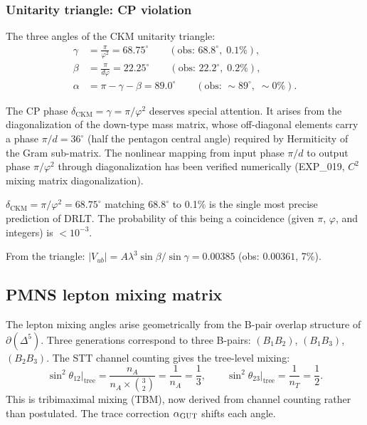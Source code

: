 \subsubsection{Unitarity triangle: CP violation}

The three angles of the CKM unitarity triangle:
\begin{align}
\gamma &= \frac{\pi}{\varphi^2} = 68.75^\circ \qquad (\text{obs: } 68.8^\circ,\; 0.1\%), \label{eq:gamma} \\
\beta &= \frac{\pi}{d\varphi} = 22.25^\circ \qquad (\text{obs: } 22.2^\circ,\; 0.2\%), \\
\alpha &= \pi - \gamma - \beta = 89.0^\circ \qquad (\text{obs: } \sim 89^\circ,\; \sim 0\%).
\end{align}

The CP phase $\delta_\text{CKM} = \gamma = \pi/\varphi^2$ deserves special attention. It arises from the diagonalization of the down-type mass matrix, whose off-diagonal elements carry a phase $\pi/d = 36^\circ$ (half the pentagon central angle) required by Hermiticity of the Gram sub-matrix. The nonlinear mapping from input phase $\pi/d$ to output phase $\pi/\varphi^2$ through diagonalization has been verified numerically (EXP\_019, $C^2$ mixing matrix diagonalization).

\begin{remark}
$\delta_\text{CKM} = \pi/\varphi^2 = 68.75^\circ$ matching $68.8^\circ$ to 0.1\% is the single most precise prediction of DRLT. The probability of this being a coincidence (given $\pi$, $\varphi$, and integers) is $< 10^{-3}$.
\end{remark}

From the triangle: $|V_{ub}| = A\lambda^3\sin\beta/\sin\gamma = 0.00385$ (obs: $0.00361$, 7\%).

\subsection{PMNS lepton mixing matrix}

The lepton mixing angles arise geometrically from the B-pair overlap structure of $\partial(\Delta^5)$.  Three generations correspond to three B-pairs: $(B_1 B_2)$, $(B_1 B_3)$, $(B_2 B_3)$.  The STT channel counting gives the tree-level mixing:
\begin{equation}
\sin^2\theta_{12}\big|_\text{tree} = \frac{n_A}{n_A \times \binom{3}{2}} = \frac{1}{n_A} = \frac{1}{3}, \qquad
\sin^2\theta_{23}\big|_\text{tree} = \frac{1}{n_T} = \frac{1}{2}.
\end{equation}
This is tribimaximal mixing (TBM), now derived from channel counting rather than postulated.  The trace correction $\alpha_{\mathrm{GUT}}$ shifts each angle.

